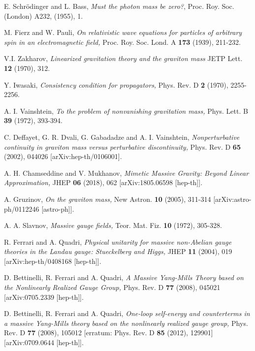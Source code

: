 \documentclass{article}
\begin{document}
\begin{thebibliography}{9}
E. Schr\"{o}dinger and L. Bass, \textit{Must the photon mass be zero?}, Proc. Roy. Soc. (London) A232, (1955), 1.


M. Fierz and W. Pauli, \textit{On relativistic wave equations for particles of arbitrary spin in an electromagnetic field,}  Proc. Roy. Soc. Lond. A \textbf{173} (1939), 211-232.

V.I. Zakharov, \textit{Linearized gravitation theory and the graviton mass} JETP Lett. \textbf{12} (1970), 312.

Y. Iwasaki, \textit{Consistency condition for propagators,} Phys. Rev. D \textbf{2} (1970), 2255-2256.


A. I. Vainshtein, \textit{To the problem of nonvanishing gravitation mass,} Phys. Lett. B \textbf{39} (1972), 393-394.



C. Deffayet, G. R. Dvali, G. Gabadadze and A. I. Vainshtein, \textit{Nonperturbative continuity in
graviton mass versus perturbative discontinuity,} Phys. Rev. D \textbf{65} (2002), 044026 [arXiv:hep-th/0106001].


A. H. Chamseddine and V. Mukhanov, \textit{Mimetic Massive Gravity: Beyond Linear Approximation,} JHEP \textbf{06} (2018), 062 [arXiv:1805.06598 [hep-th]].

A. Gruzinov, \textit{On the graviton mass,} New Astron. \textbf{10} (2005), 311-314 [arXiv:astro-ph/0112246 [astro-ph]].

A. A. Slavnov, \textit{Massive gauge fields,} Teor. Mat. Fiz. \textbf{10} (1972), 305-328.

 
R. Ferrari and A. Quadri, \textit{Physical unitarity for massive non-Abelian gauge theories in the Landau gauge: Stueckelberg and Higgs,} JHEP \textbf{11} (2004), 019 [arXiv:hep-th/0408168 [hep-th]].




D. Bettinelli, R. Ferrari and A. Quadri, \textit{A Massive Yang-Mills Theory based on the Nonlinearly Realized Gauge Group,} Phys. Rev. D \textbf{77} (2008), 045021 [arXiv:0705.2339 [hep-th]].

D. Bettinelli, R. Ferrari and A. Quadri, \textit{One-loop self-energy and counterterms in a massive Yang-Mills theory based on the nonlinearly realized gauge group,} Phys. Rev. D \textbf{77} (2008), 105012
[erratum: Phys. Rev. D \textbf{85} (2012), 129901]
[arXiv:0709.0644 [hep-th]].


\end{thebibliography}
\end{document}
